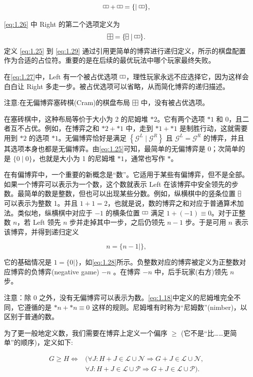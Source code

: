 \[
\domH + \domH = \{\mid \domH\},
\]

\eqref{eq:1.26} 中 Right 的第二个选项定义为
\begin{equation}
\label{eq:1.29}
\domSq = \{\domV \mid \domH\}.
\end{equation}
定义 \eqref{eq:1.25} 到 \eqref{eq:1.29} 通过引用更简单的博弈进行递归定义，所示的棋盘配置作为合适的占位符。重要的是在后续的最优玩法中哪个玩家最终失败。

在\eqref{eq:1.27}中，Left 有一个被占优选项 \(\domH\)，理性玩家永远不应选择它，因为这样会白白让 Right 多走一步。被占优选项可以省略，从而简化博弈的递归描述。

注意:在无偏博弈塞砖棋(Cram)的棋盘布局 \(\domSq\) 中，没有被占优选项。

在塞砖棋中，这种布局等价于大小为 2 的尼姆堆 \(*2\)。它有两个选项 \(*1\) 和 0，且二者互不占优。例如，在博弈之和 \(*2+*1\) 中，走到 \(*1+*1\) 是制胜行动，这就需要用到 \(*2\) 的选项 \(*1\)。无偏博弈恰好是满足 \(\left\{ {{\mathcal{G}}^{L}\mid{\mathcal{G}}^{R}}\right\}\) 且 \({\mathcal{G}}^{L}={\mathcal{G}}^{R}\) 的博弈，并且其选项本身也都是无偏博弈。由\eqref{eq:1.25}可知，最简单的无偏博弈是 0；次简单的是 \(\{0\mid0\}\)，也就是大小为 1 的尼姆堆 \(*1\)，通常也写作 \(*\)。

在有偏博弈中，一个重要的新概念是“数”。它适用于某些有偏博弈，但不是全部。如果一个博弈可以表示为一个数，这个数就表示 Left 在该博弈中安全领先的步数。最简单的数是整数，但也可以出现某些分数。例如，纵横棋中的竖条位置 \(\domV\) 可以表示为整数 1。并且 \(1+1=2\)，也就是说，数的博弈之和对应于普通算术加法。类似地，纵横棋中对应于 \(-1\) 的横条位置 \(\domH\) 满足 \(1+\left({-1}\right)\equiv0\)。对于正整数 \(n\)，若 Left 领先 \(n\) 步并走掉其中一步，之后仍领先 \(n-1\) 步。于是可用 \(n\) 表示该博弈，并得到递归定义

\begin{equation}
\label{eq:1.30}
n = \{n-1\mid\},
\end{equation}

它的基础情况是 \(1=\{0\mid\}\)，如\eqref{eq:1.28}所示。负整数对应的博弈被定义为正整数对应博弈的负博弈(negative game) \(- n\) 。在博弈 \(- n\) 中，后手玩家(右方)领先 \(n\) 步。

注意：除 0 之外，没有无偏博弈可以表示为数。\eqref{eq:1.18}中定义的尼姆堆完全不同，它遵循的是 \(*n+*n\equiv0\) 这样的规则。尼姆堆有时称为“尼姆数”(nimber)，以区别于普通的数。

为了更一般地定义数，我们需要在博弈上定义一个偏序 \(\geq\) (它不是“比……更简单”的顺序)，定义如下:

\begin{equation}
\label{eq:1.31}
\begin{aligned}
G \geq H \Leftrightarrow {}&
(\forall J : H + J \in \mathcal{L} \cup \mathcal{N} \Rightarrow G + J \in \mathcal{L} \cup \mathcal{N},\\
&\forall J : H + J \in \mathcal{L} \cup \mathcal{P} \Rightarrow G + J \in \mathcal{L} \cup \mathcal{P}).
\end{aligned}
\end{equation}

